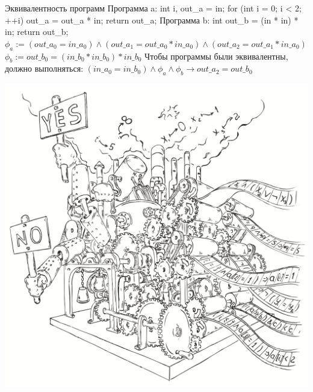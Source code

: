 \documentclass{beamer}
\begin{document}
\begin{frame}{Эквивалентность программ}
Программа a:\newline
int i, out\_a = in;\newline
for (int i = 0; i < 2; ++i) out\_a = out\_a * in;\newline
return out\_a;\newline
Программа b:\newline
int out\_b = (in * in) * in;\newline
return out\_b;\newline
$\phi_a := (out\_a_0 = in\_a_0) \wedge (out\_a_1 = out\_a_0 * in\_a_0) \wedge (out\_a_2 = out\_a_1 * in\_a_0)$\newline
$\phi_b := out\_b_0 = (in\_b_0 * in\_b_0) * in\_b_0$\newline
Чтобы программы были эквивалентны, должно выполняться:\newline
$(in\_a_0 = in\_b_0) \wedge \phi_a \wedge \phi_b \rightarrow out\_a_2 = out\_b_0$
\end{frame}

\begin{frame}
\includegraphics[scale=0.5]{../decision-procedure.png}
\end{frame}
\end{document}
